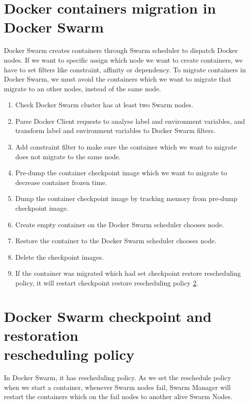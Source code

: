 \section{Docker containers migration in Docker Swarm}
Docker Swarm creates containers through Swarm scheduler to dispatch Docker nodes. If we want to specific assign which node we want to create containers, we have to set filters like constraint, affinity or dependency.
To migrate containers in Docker Swarm, we must avoid the containers which we want to migrate that migrate to an other nodes, instead of the same node.
\begin{enumerate}[Step 1.]
	\item Check Docker Swarm cluster has at least two Swarm nodes.
    \item Parse Docker Client requests to analyse label and environment variables, and transform label and environment variables to Docker Swarm filters.
    \item Add constraint filter to make sure the container which we want to migrate does not migrate to the same node.
    \item Pre-dump the container checkpoint image which we want to migrate to decrease container frozen time.
    \item Dump the container checkpoint image by tracking memory from pre-dump checkpoint image.
    \item Create empty container on the Docker Swarm scheduler chooses node.
    \item Restore the container to the Docker Swarm scheduler chooses node.
    \item Delete the checkpoint images.
    \item If the container was migrated which had set checkpoint restore rescheduling policy, it will restart checkpoint restore rescheduling policy \ref{sec:checkpoint restore rescheduling policy}.
\end{enumerate}

\section{Docker Swarm checkpoint and restoration \\rescheduling policy}
\label{sec:checkpoint restore rescheduling policy}
In Docker Swarm, it has rescheduling policy. As we set the reschedule policy when we start a container, whenever Swarm nodes fail, Swarm Manager will restart the containers which on the fail nodes to another alive Swarm Nodes.

